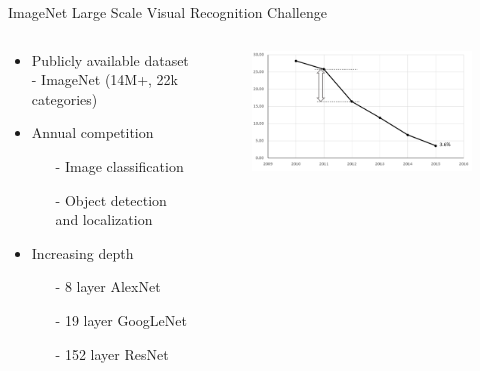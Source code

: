 \begin{frame}{ImageNet Large Scale Visual Recognition Challenge}

\begin{columns}
	\begin{column}{.5\textwidth}
		\begin{itemize}
			\item Publicly available dataset - ImageNet (14M+, 22k categories)
			\item Annual competition 
			\begin{itemize}
				\item[-] Image classification 
				\item[-] Object detection and localization
			\end{itemize}
			\item Increasing depth 
			\begin{itemize}
				\item[-] 8 layer AlexNet
				\item[-] 19 layer  GoogLeNet
				\item[-] 152 layer ResNet 
			\end{itemize}
 
		\end{itemize}
	\end{column}
	\begin{column}{.5\textwidth}
		\begin{figure}
			\includegraphics[width=1.2\textwidth, center]{figures/ilsvrc_2015_plot}
		\end{figure}
	\end{column}
\end{columns}

 
\end{frame}
